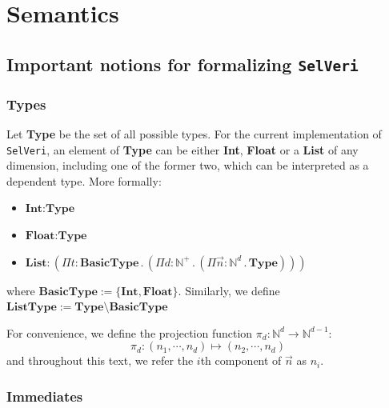 \documentclass{article}
\begin{document}
\newpage
\section{Semantics}

\subsection{Important notions for formalizing \texttt{SelVeri}}

\subsubsection{Types}

Let \textbf{Type} be the set of all possible types. For the current implementation of \texttt{SelVeri}, an element of \textbf{Type} can be either \textbf{Int}, \textbf{Float} or a \textbf{List} of any dimension, including one of the former two, which can be interpreted as a dependent type. More formally:
\begin{itemize}
    \item $\textbf{Int} : \textbf{Type}$ 
    \item $\textbf{Float} : \textbf{Type}$ 
    \item $ \textbf{List}: (\Pi{t} : \textbf{BasicType} \, . \,  (\Pi{d} : \textbf{$\mathbb{N}^+$} \, . \,  (\Pi{\vec{n}} : \textbf{$\mathbb{N}^d$} \, . \,  \textbf{Type})))$
\end{itemize} where $\textbf{BasicType} := \{\textbf{Int}, \textbf{Float}\}$. Similarly, we define $\textbf{ListType} := \textbf{Type} \setminus \textbf{BasicType}$ 

For convenience, we define the projection function $\pi_d: \mathbb{N}^d \to \mathbb{N}^{d-1}$:
\[
\pi_d: (n_1,\cdots,n_d) \mapsto (n_2,\cdots,n_d)
\]
and throughout this text, we refer the $i$th component of $\vec{n}$ as $n_i$.

\subsubsection{Immediates}
\end{document}
